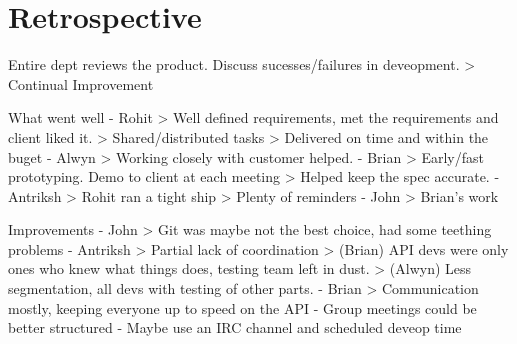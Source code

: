 

\section{Retrospective}

Entire dept reviews the product.
Discuss sucesses/failures in deveopment.
> Continual Improvement

What went well
- Rohit
 > Well defined requirements, met the requirements and client liked it.
 > Shared/distributed tasks
 > Delivered on time and within the buget
- Alwyn
 > Working closely with customer helped.
- Brian
 > Early/fast prototyping. Demo to client at each meeting
 > Helped keep the spec accurate.
- Antriksh
 > Rohit ran a tight ship
 > Plenty of reminders
- John
 > Brian's work

Improvements
- John
 > Git was maybe not the best choice, had some teething problems
- Antriksh
 > Partial lack of coordination
 > (Brian) API devs were only ones who knew what things does, testing team left in dust.
 > (Alwyn) Less segmentation, all devs with testing of other parts.
- Brian
 > Communication mostly, keeping everyone up to speed on the API
- Group meetings could be better structured
- Maybe use an IRC channel and scheduled deveop time



